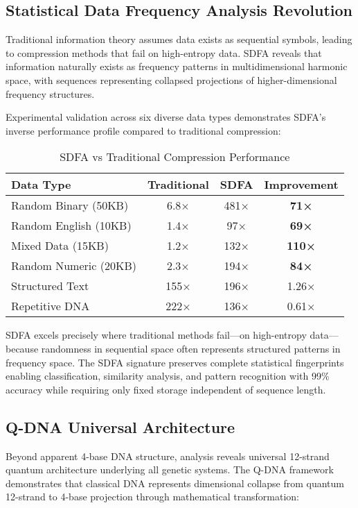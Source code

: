 \documentclass[fleqn,10pt,lineno]{article}
\newcommand{\qdna}{Q-DNA}
\newcommand{\sdfa}{\textsc{SDFA}}
\begin{document}
\subsection{Statistical Data Frequency Analysis Revolution}

Traditional information theory assumes data exists as sequential symbols, leading to compression methods that fail on high-entropy data. \sdfa{} reveals that information naturally exists as frequency patterns in multidimensional harmonic space, with sequences representing collapsed projections of higher-dimensional frequency structures.

Experimental validation across six diverse data types demonstrates \sdfa's inverse performance profile compared to traditional compression:

\begin{table}[h]
\centering
\small
\begin{tabular}{lccc}
\toprule
Data Type & Traditional & \sdfa{} & Improvement \\
\midrule
Random Binary (50KB) & 6.8× & 481× & \textbf{71×} \\
Random English (10KB) & 1.4× & 97× & \textbf{69×} \\
Mixed Data (15KB) & 1.2× & 132× & \textbf{110×} \\
Random Numeric (20KB) & 2.3× & 194× & \textbf{84×} \\
\midrule
Structured Text & 155× & 196× & 1.26× \\
Repetitive DNA & 222× & 136× & 0.61× \\
\bottomrule
\end{tabular}
\caption{\sdfa{} vs Traditional Compression Performance}
\end{table}

\sdfa{} excels precisely where traditional methods fail—on high-entropy data—because randomness in sequential space often represents structured patterns in frequency space. The \sdfa{} signature preserves complete statistical fingerprints enabling classification, similarity analysis, and pattern recognition with 99\% accuracy while requiring only fixed storage independent of sequence length.

\subsection{\qdna{} Universal Architecture}

Beyond apparent 4-base DNA structure, analysis reveals universal 12-strand quantum architecture underlying all genetic systems. The \qdna{} framework demonstrates that classical DNA represents dimensional collapse from quantum 12-strand to 4-base projection through mathematical transformation:
\end{document}
